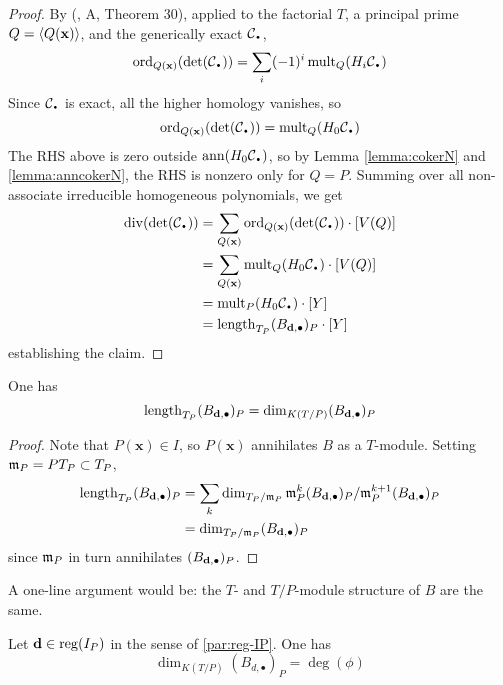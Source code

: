 \documentclass[fleqn,reqno]{amsart}
\begin{document}
\begin{proof}
By (\citet{GKZ94}, A, Theorem 30), applied to the factorial $T$, a principal prime $Q=\langle Q(\mathbf x)\rangle$,
and the generically exact $\mathcal{C}_\nbul$,
\[
	\ord_{Q(\mathbf x)}(\det(\mathcal{C}_\nbul))=\sum_i (-1)^i \mult_Q(H_i\mathcal{C}_\nbul)
\]
Since $\mathcal{C}_\nbul$ is exact, all the higher homology vanishes, so
\[
	\ord_{Q(\mathbf x)}(\det(\mathcal{C}_\nbul))=\mult_Q(H_0\mathcal{C}_\nbul)
\]
The RHS above is zero outside $\ann(H_0\mathcal{C}_\nbul)$,
so by Lemma \ref{lemma:cokerN} and \ref{lemma:anncokerN},
the RHS is nonzero only for $Q=P$.
Summing over all non-associate irreducible homogeneous polynomials,
we get
\begin{align*}
	\thediv(\det(\mathcal{C}_\nbul))&=\sum_{Q(\mathbf x)}
		\ord_{Q(\mathbf x)}(\det(\mathcal{C}_\nbul))\cdot[V(Q)]\\
	&=\sum_{Q(\mathbf x)} \mult_Q (H_0\mathcal{C}_\nbul)\cdot [V(Q)]\\
	&=\mult_P (H_0\mathcal{C}_\nbul)\cdot[Y]\\
	&=\length_{T_P}(B_{\d,\bullet})_P\cdot[Y]
\end{align*}
establishing the claim.
\end{proof}

\begin{lemma}
\label{lemma:lengthBdimB}
One has
\[
	\operatorname{length}_{T_P}(B_{\mathbf d,\bullet})_P=\dim_{K(T/P)}(B_{\mathbf d,\bullet})_P
\]
\end{lemma}

\begin{proof}
Note that $P(\mathbf x)\in I$, so $P(\mathbf x)$ annihilates $B$ as a $T$-module.
Setting $\mathfrak{m}_P=PT_P\subset T_P$,
\begin{align*}
	\operatorname{length}_{T_P}(B_{\mathbf d,\bullet})_P&=
	\sum_{k}\dim_{T_P/\mathfrak{m}_P} \mathfrak{m}_P^{k}(B_{\mathbf d,\bullet})_P/\mathfrak{m}_P^{k+1}(B_{\mathbf d,\bullet})_P\\
	&=\dim_{T_P/\mathfrak{m}_P}(B_{\mathbf d,\bullet})_P
\end{align*}
since $\mathfrak{m}_P$ in turn annihilates $(B_{\mathbf d,\bullet})_P$.
\end{proof}

\begin{remarkhint}
A one-line argument would be: the $T$- and $T/P$-module structure of $B$ are the same.
\end{remarkhint}

\begin{lemma}
\label{lemma:lengthRees}
Let $\mathbf d\in \operatorname{reg}(I_P)$ in the sense of \eqref{par:reg-IP}. One has
\[
	\dim_{K(T/P)} (B_{d,\bullet})_P=\deg(\phi)
\]
\end{lemma}
\end{document}
